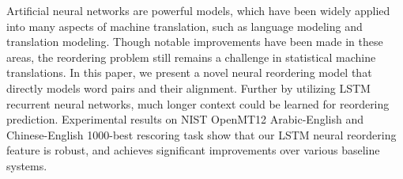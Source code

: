 Artificial neural networks are powerful models, which have been widely applied into many aspects of machine translation, such as language modeling and translation modeling. Though notable improvements have been made in these areas, the reordering problem still remains a challenge in statistical machine translations. In this paper, we present a novel neural reordering model that directly models word pairs and their alignment. Further by utilizing LSTM recurrent neural networks, much longer context could be learned for reordering prediction. Experimental results on NIST OpenMT12 Arabic-English and Chinese-English 1000-best rescoring task show that our LSTM neural reordering feature is robust, and achieves significant improvements over various baseline systems.
